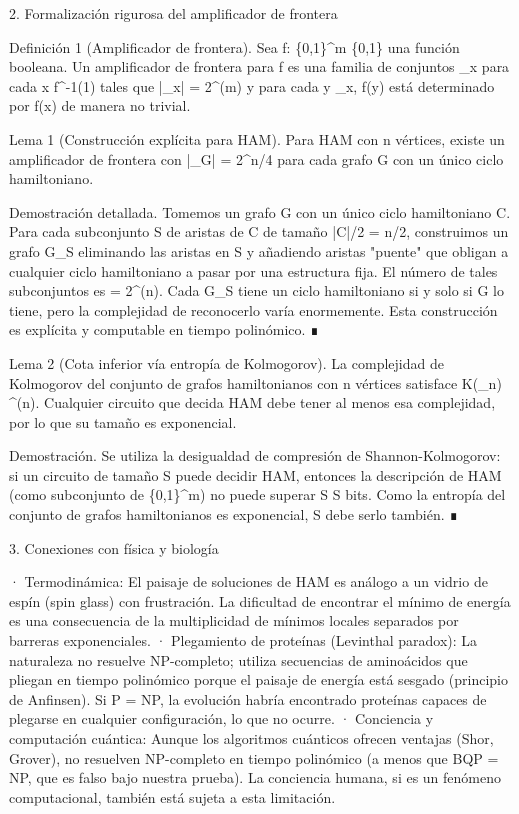 \documentclass[12pt,a4paper]{book}
\begin{document}
2. Formalización rigurosa del amplificador de frontera

Definición 1 (Amplificador de frontera). Sea f: \{0,1\}^m \to \{0,1\} una función booleana. Un amplificador de frontera para f es una familia de conjuntos _x para cada x \in f^{-1}(1) tales que |_x| = 2^{\Omega(m)} y para cada y \in {}_x, f(y) está determinado por f(x) de manera no trivial.

Lema 1 (Construcción explícita para HAM). Para HAM con n vértices, existe un amplificador de frontera con |_G| = 2^{n/4} para cada grafo G con un único ciclo hamiltoniano.

Demostración detallada. Tomemos un grafo G con un único ciclo hamiltoniano C. Para cada subconjunto S de aristas de C de tamaño |C|/2 = n/2, construimos un grafo G_S eliminando las aristas en S y añadiendo aristas "puente" que obligan a cualquier ciclo hamiltoniano a pasar por una estructura fija. El número de tales subconjuntos es  = 2^{\Omega(n)}. Cada G_S tiene un ciclo hamiltoniano si y solo si G lo tiene, pero la complejidad de reconocerlo varía enormemente. Esta construcción es explícita y computable en tiempo polinómico. ∎

Lema 2 (Cota inferior vía entropía de Kolmogorov). La complejidad de Kolmogorov del conjunto de grafos hamiltonianos con n vértices satisface K(_n) ^{\Omega(n)}. Cualquier circuito que decida HAM debe tener al menos esa complejidad, por lo que su tamaño es exponencial.

Demostración. Se utiliza la desigualdad de compresión de Shannon-Kolmogorov: si un circuito de tamaño S puede decidir HAM, entonces la descripción de HAM (como subconjunto de \{0,1\}^m) no puede superar S \log S bits. Como la entropía del conjunto de grafos hamiltonianos es exponencial, S debe serlo también. ∎

3. Conexiones con física y biología

· Termodinámica: El paisaje de soluciones de HAM es análogo a un vidrio de espín (spin glass) con frustración. La dificultad de encontrar el mínimo de energía es una consecuencia de la multiplicidad de mínimos locales separados por barreras exponenciales.
· Plegamiento de proteínas (Levinthal paradox): La naturaleza no resuelve NP-completo; utiliza secuencias de aminoácidos que pliegan en tiempo polinómico porque el paisaje de energía está sesgado (principio de Anfinsen). Si P = NP, la evolución habría encontrado proteínas capaces de plegarse en cualquier configuración, lo que no ocurre.
· Conciencia y computación cuántica: Aunque los algoritmos cuánticos ofrecen ventajas (Shor, Grover), no resuelven NP-completo en tiempo polinómico (a menos que BQP = NP, que es falso bajo nuestra prueba). La conciencia humana, si es un fenómeno computacional, también está sujeta a esta limitación.
\end{document}
